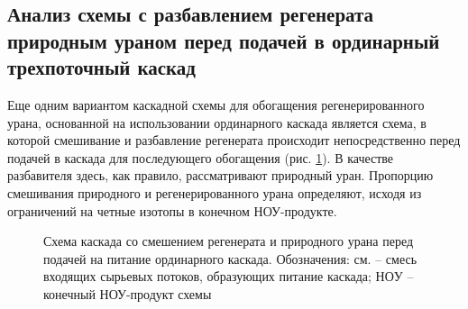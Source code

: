 \subsection{Анализ схемы с разбавлением регенерата природным ураном перед подачей в ординарный трехпоточный каскад}

Еще одним вариантом каскадной схемы для обогащения регенерированного урана, основанной на использовании ординарного каскада является схема, в которой смешивание и разбавление регенерата происходит непосредственно перед подачей в каскада для последующего обогащения (рис. \ref{o3}). В качестве разбавителя здесь, как правило, рассматривают природный уран. Пропорцию смешивания природного и регенерированного урана определяют, исходя из ограничений на четные изотопы в конечном НОУ-продукте.

\begin{figure}[ht]
  \caption{Схема каскада со смешением регенерата и природного урана перед подачей на питание ординарного каскада. Обозначения: см. -- смесь входящих сырьевых потоков, образующих питание каскада; $НОУ$ -- конечный НОУ-продукт схемы}\label{o3}
\end{figure}

